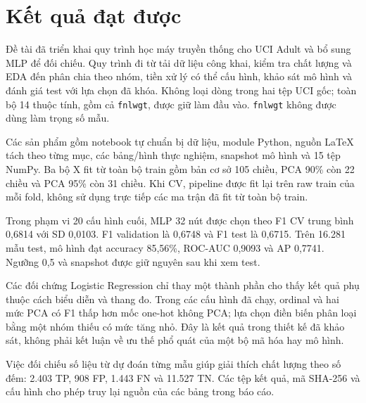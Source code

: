 \section{Kết quả đạt được}
\label{sec:7_1}
Đề tài đã triển khai quy trình học máy truyền thống cho UCI Adult và bổ sung MLP để đối chiếu. Quy trình đi từ tải dữ liệu công khai, kiểm tra chất lượng và EDA đến phân chia theo nhóm, tiền xử lý có thể cấu hình, khảo sát mô hình và đánh giá test với lựa chọn đã khóa. Không loại dòng trong hai tệp UCI gốc; toàn bộ 14 thuộc tính, gồm cả \texttt{fnlwgt}, được giữ làm đầu vào. \texttt{fnlwgt} không được dùng làm trọng số mẫu.

Các sản phẩm gồm notebook tự chuẩn bị dữ liệu, module Python, nguồn LaTeX tách theo từng mục, các bảng/hình thực nghiệm, snapshot mô hình và 15 tệp NumPy. Ba bộ X fit từ toàn bộ train gồm bản cơ sở 105 chiều, PCA 90\% còn 22 chiều và PCA 95\% còn 31 chiều. Khi CV, pipeline được fit lại trên raw train của mỗi fold, không sử dụng trực tiếp các ma trận đã fit từ toàn bộ train.

Trong phạm vi 20 cấu hình cuối, MLP 32 nút được chọn theo F1 CV trung bình 0,6814 với SD 0,0103. F1 validation là 0,6748 và F1 test là 0,6715. Trên 16.281 mẫu test, mô hình đạt accuracy 85,56\%, ROC-AUC 0,9093 và AP 0,7741. Ngưỡng 0,5 và snapshot được giữ nguyên sau khi xem test.

Các đối chứng Logistic Regression chỉ thay một thành phần cho thấy kết quả phụ thuộc cách biểu diễn và thang đo. Trong các cấu hình đã chạy, ordinal và hai mức PCA có F1 thấp hơn mốc one-hot không PCA; lựa chọn điền biến phân loại bằng một nhóm thiếu có mức tăng nhỏ. Đây là kết quả trong thiết kế đã khảo sát, không phải kết luận về ưu thế phổ quát của một bộ mã hóa hay mô hình.

Việc đối chiếu số liệu từ dự đoán từng mẫu giúp giải thích chất lượng theo số đếm: 2.403 TP, 908 FP, 1.443 FN và 11.527 TN. Các tệp kết quả, mã SHA-256 và cấu hình cho phép truy lại nguồn của các bảng trong báo cáo.

